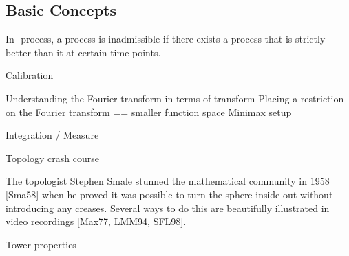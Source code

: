 \subsection{Basic Concepts}

\begin{define}[Admissibility]
	In \E-process, a process is inadmissible
	if there exists a process that is strictly better than it at certain time points.
\end{define}

Calibration


Understanding the Fourier transform in terms of transform
Placing a restriction on the Fourier transform == smaller function space
Minimax setup

Integration / Measure

Topology crash course

The topologist Stephen Smale stunned the mathematical community in
1958 [Sma58] when he proved it was possible to turn the sphere inside out
without introducing any creases. Several ways to do this are beautifully
illustrated in video recordings [Max77, LMM94, SFL98].

Tower properties




